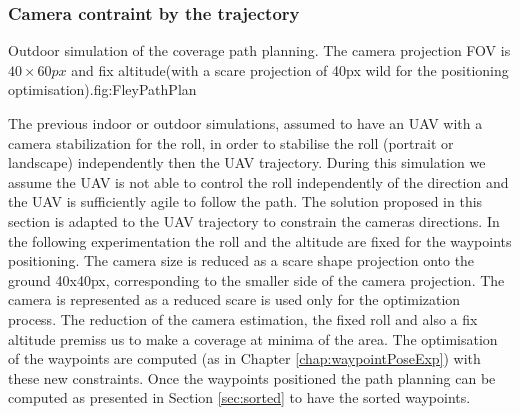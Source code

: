 \subsubsection{Camera contraint by the trajectory} \label{sec:holonomie path}
  \begin{mfigures}[!]{Outdoor simulation of the coverage path planning. The camera projection FOV is $40 \times 60 px$  and fix altitude(with  a scare projection of 40px wild for the positioning optimisation).}{fig:FleyPathPlan} \centering
\hspace{1cm}
\tabsimuposeFleyPathHolonom
\end{mfigures} 

The previous indoor or outdoor simulations, assumed to have an UAV with a camera stabilization for the roll, in order to stabilise the roll (portrait or landscape) independently then the UAV trajectory.
During this simulation we assume the UAV is not able to control the roll independently of the direction and the UAV is sufficiently agile to follow the path.
The solution proposed in this section is adapted to the UAV trajectory to constrain the cameras directions. 
In the following experimentation the roll and the altitude are fixed for the waypoints positioning. The camera size is reduced as a scare shape projection onto the ground 40x40px, corresponding to the smaller side of the camera projection. The camera is represented as a reduced scare is used only for the optimization process.
 The reduction of the camera estimation, the fixed roll and also a fix altitude premiss us to make a coverage at minima of the area.
The optimisation of the waypoints are computed (as in Chapter \ref{chap:waypointPoseExp}) with these new constraints. Once the waypoints positioned  
the path planning can be computed as presented in Section \ref{sec:sorted} to have the sorted waypoints.

